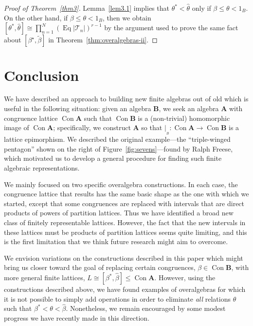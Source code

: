 \documentclass{au}
\numberwithin{equation}{section}
\theoremstyle{plain}
\theoremstyle{definition}
\newcommand{\<}{\ensuremath{\langle}}
\renewcommand{\>}{\ensuremath{\rangle}}
\newcommand{\bA}{\ensuremath{\mathbf{A}}}
\newcommand{\bB}{\ensuremath{\mathbf{B}}}
\newcommand{\sT}{\ensuremath{\mathscr{T}}}
\DeclareMathOperator{\Eq}{Eq}
\DeclareMathOperator{\Con}{Con}
\renewcommand{\leq}{\ensuremath{\leqslant}}
\newcommand{\resB}{\ensuremath{|_{_B}}}
\newcommand{\tbeta}{\ensuremath{\widetilde{\beta}}}
\begin{document}
\begin{proof}[Proof of Theorem~\ref{thm3}]
Lemma~\ref{lem3.1} implies that $\theta^* < \widehat{\theta}$ only if
$\beta\leq \theta < 1_B$. On the other hand,
if $\beta\leq \theta < 1_B$, then we obtain
$[\theta^*, \widehat{\theta}] \cong \prod_{n=1}^N(\Eq|\sT_n|)^{r-1}$
by the argument used to prove the same fact about
$[\beta^\star, \tbeta]$
in Theorem~\ref{thm:overalgebras-ii}.
\end{proof}

\section{Conclusion}
We have described an approach to building new finite algebras out of old
which is useful in the following situation: given an algebra $\bB$,
we seek an algebra $\bA$ with congruence lattice $\Con \bA$ such that $\Con \bB$
is a (non-trivial) homomorphic image of $\Con \bA$; specifically, we construct
$\bA$ so that $\resB \colon  \Con \bA \rightarrow \Con \bB$ is a lattice epimorphism.
We described the original example---the ``triple-winged pentagon'' shown on
the right of Figure~\ref{fig:sevens}---found by Ralph Freese, which
motivated us to develop a general procedure for finding such finite algebraic
representations.

We mainly focused on two specific overalgebra constructions.
In each case, the congruence lattice that results has the same basic shape as
the one with which we started, except that some congruences are replaced with
intervals that are direct products of powers of partition lattices.
Thus we have identified a broad new class of finitely representable lattices.
However, the fact that the new intervals in these lattices must be products of
partition lattices seems quite limiting, and this is the first limitation that we
think future research might aim to overcome.

We envision variations on the constructions described in this paper
which might bring us closer toward the goal of replacing certain congruences,
$\beta\in \Con \bB$, with more general finite lattices,
$L\cong [\beta^*, \widehat{\beta}] \leq \Con \bA$.
However, using the constructions described above, we have found examples of
overalgebras for which it is not possible to simply add operations
in order to eliminate \emph{all} relations $\theta$ such that
$\beta^* < \theta < \widehat{\beta}$.
Nonetheless, we remain encouraged by some modest progress we have
recently made in this direction.
\end{document}
